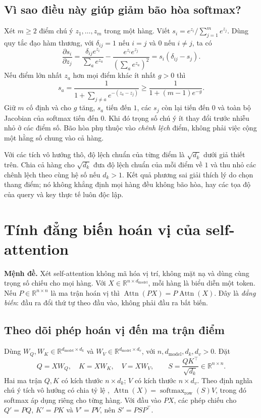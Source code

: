 \documentclass[11pt,a4paper]{article}
\DeclareMathOperator{\softmax}{softmax}
\newcommand{\R}{\mathbb{R}}
\newcommand{\Attn}{\operatorname{Attn}}
\begin{document}
\subsection*{Vì sao điều này giúp giảm bão hòa softmax?}
Xét $m\ge2$ điểm chú ý $z_1,\ldots,z_m$ trong một hàng. Viết $s_i=e^{z_i}/\sum_{j=1}^m e^{z_j}$. Dùng quy tắc đạo hàm thương, với $\delta_{ij}=1$ nếu $i=j$ và $0$ nếu $i\ne j$, ta có
\[
  \frac{\partial s_i}{\partial z_j}
  =\frac{\delta_{ij}e^{z_i}}{\sum_a e^{z_a}}
   -\frac{e^{z_i}e^{z_j}}{(\sum_a e^{z_a})^2}
  =s_i(\delta_{ij}-s_j).
\]
Nếu điểm lớn nhất $z_a$ hơn mọi điểm khác ít nhất $g>0$ thì
\[
  s_a=\frac{1}{1+\sum_{j\ne a} e^{-(z_a-z_j)}}
    \ge \frac{1}{1+(m-1)e^{-g}}.
\]
Giữ $m$ cố định và cho $g$ tăng, $s_a$ tiến đến $1$, các $s_j$ còn lại tiến đến $0$ và toàn bộ Jacobian của softmax tiến đến $0$. Khi đó trọng số chú ý ít thay đổi trước nhiễu nhỏ ở các điểm số. Bão hòa phụ thuộc vào \emph{chênh lệch} điểm, không phải việc cộng một hằng số chung vào cả hàng.

Với các tích vô hướng thô, độ lệch chuẩn của từng điểm là $\sqrt{d_k}$ dưới giả thiết trên. Chia cả hàng cho $\sqrt{d_k}$ đưa độ lệch chuẩn của mỗi điểm về $1$ và thu nhỏ các chênh lệch theo cùng hệ số nếu $d_k>1$. Kết quả phương sai giải thích lý do chọn thang điểm; nó không khẳng định mọi hàng đều không bão hòa, hay các tọa độ của query và key thực tế luôn độc lập.

\section{Tính đẳng biến hoán vị của self-attention}
\label{sec:perm}
\textbf{Mệnh đề.} Xét self-attention không mã hóa vị trí, không mặt nạ và dùng cùng trọng số chiếu cho mọi hàng. Với $X\in\R^{n\times d_{\mathrm{model}}}$, mỗi hàng là biểu diễn một token. Nếu $P\in\R^{n\times n}$ là ma trận hoán vị thì $\Attn(PX)=P\Attn(X)$. Đây là \emph{đẳng biến}: đầu ra đổi thứ tự theo đầu vào, không phải đầu ra bất biến.

\subsection*{Theo dõi phép hoán vị đến ma trận điểm}
Dùng $W_Q,W_K\in\R^{d_{\mathrm{model}}\times d_k}$ và $W_V\in\R^{d_{\mathrm{model}}\times d_v}$, với $n,d_{\mathrm{model}},d_k,d_v>0$. Đặt
\[
  Q=XW_Q,\quad K=XW_K,\quad V=XW_V,\qquad
  S=\frac{QK^\top}{\sqrt{d_k}}\in\R^{n\times n}.
\]
Hai ma trận $Q,K$ có kích thước $n\times d_k$; $V$ có kích thước $n\times d_v$. Theo định nghĩa chú ý tích vô hướng có chia tỷ lệ \cite[§3.2.1]{attention}, $\Attn(X)=\softmax_{\mathrm{row}}(S)V$, trong đó softmax áp dụng riêng cho từng hàng. Với đầu vào $PX$, các phép chiếu cho $Q'=PQ$, $K'=PK$ và $V'=PV$, nên $S'=PSP^\top$.
\end{document}
